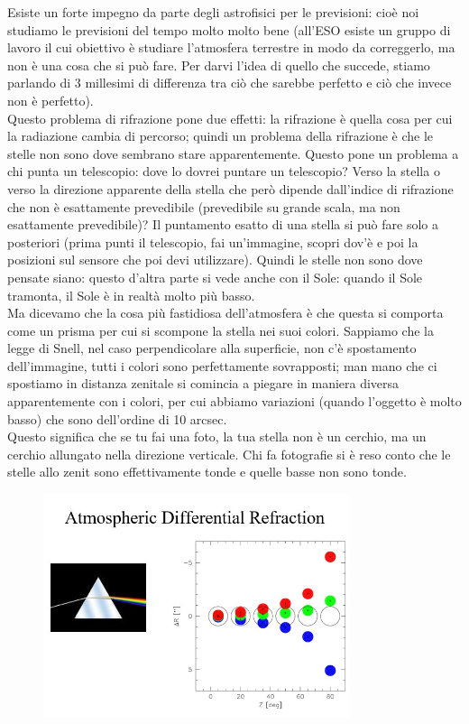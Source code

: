 \documentclass[a4paper,11pt]{article}
\begin{document}
Esiste un forte impegno da parte degli astrofisici per le previsioni: cioè noi studiamo le previsioni del tempo molto molto bene (all’ESO esiste un gruppo di lavoro il cui obiettivo è studiare l’atmosfera terrestre in modo da correggerlo, ma non è una cosa che si può fare. Per darvi l’idea di quello che succede, stiamo parlando di 3 millesimi di differenza tra ciò che sarebbe perfetto e ciò che invece non è perfetto).
\\Questo problema di rifrazione pone due effetti: la rifrazione è quella cosa per cui la radiazione cambia di percorso; quindi un problema della rifrazione è che le stelle non sono dove sembrano stare apparentemente. Questo pone un problema a chi punta un telescopio: dove lo dovrei puntare un telescopio? Verso la stella o verso la direzione apparente della stella che però dipende dall’indice di rifrazione che non è esattamente prevedibile (prevedibile su grande scala, ma non esattamente prevedibile)? Il puntamento esatto di una stella si può fare solo a posteriori (prima punti il telescopio, fai un’immagine, scopri dov’è e poi la posizioni sul sensore che poi devi utilizzare). Quindi le stelle non sono dove pensate siano: questo d’altra parte si vede anche con il Sole: quando il Sole tramonta, il Sole è in realtà molto più basso. 
\\Ma dicevamo che la cosa più fastidiosa dell’atmosfera è che questa si comporta come un prisma per cui si scompone la stella nei suoi colori. Sappiamo che la legge di Snell, nel caso perpendicolare alla superficie, non c’è spostamento dell’immagine, tutti i colori sono perfettamente sovrapposti; man mano che ci spostiamo in distanza zenitale si comincia a piegare in maniera diversa apparentemente con i colori, per cui abbiamo variazioni (quando l’oggetto è molto basso) che sono dell’ordine di 10 arcsec.
\\Questo significa che se tu fai una foto, la tua stella non è un cerchio, ma un cerchio allungato nella direzione verticale. Chi fa fotografie si è reso conto che le stelle allo zenit sono effettivamente tonde e quelle basse non sono tonde.

\begin{figure}[h!!]
        \centering
        \includegraphics[width=9cm]{26.jpg}
        \label{}
    \end{figure}
\newpage
\end{document}
